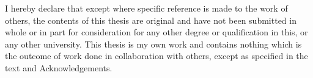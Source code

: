 
\begin{declaration}

I hereby declare that except where specific reference is made to the work of
others, the contents of this thesis are original and have not been
submitted in whole or in part for consideration for any other degree or
qualification in this, or any other university. This thesis is my own
work and contains nothing which is the outcome of work done in collaboration
with others, except as specified in the text and Acknowledgements.


\end{declaration}
